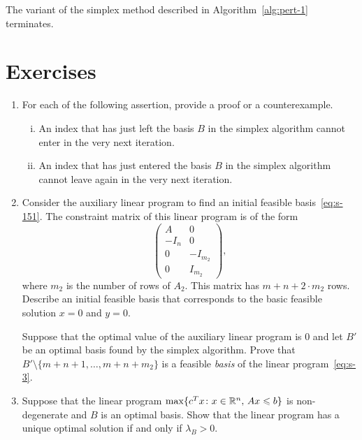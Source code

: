 \begin{theorem}
  \label{thr:6}
  The variant of the simplex method described in Algorithm~\ref{alg:pert-1} terminates. 
\end{theorem}


\section*{Exercises} 
\begin{enumerate}
\item For each of the following assertion, provide a proof or a counterexample. 
  \begin{enumerate}[i)]
  \item An index that has just left the basis $B$ in the simplex
    algorithm cannot enter in the very next iteration.
  \item An index that has just entered the basis $B$ in the simplex
    algorithm cannot leave again in the very next iteration. 
  \end{enumerate}
\item Consider the auxiliary linear program to find an initial feasible basis~\eqref{eq:s-151}. The constraint matrix of this linear program is of the form
  \begin{displaymath}
    \begin{pmatrix}
      A & 0 \\
      -I_n & 0\\ 
      0 & -I_{m_2}\\
      0 & I_{m_2}
    \end{pmatrix},
  \end{displaymath}
  where $m_2$ is the number of rows of $A_2$. This matrix has $m+n+2\cdot m_2$ rows. Describe an initial feasible basis that corresponds to the basic feasible solution $x = 0$ and $y=0$. 

Suppose that the optimal value of the auxiliary linear program is $0$ and let $B'$   be an optimal basis found by the simplex algorithm. Prove that $B' \setminus \{m+n+1,\dots,m+n+m_2\}$ is a feasible \emph{basis} of the linear program~\eqref{eq:s-3}. 

\item Suppose that the linear program $\max \{c^Tx \colon x \in \mathbb{R}^n, \, Ax \leqslant b\}$ is non-degenerate and $B$ is an optimal basis. Show that the linear program has a unique optimal solution if and only if $\lambda_B>0$. 


\end{enumerate}
